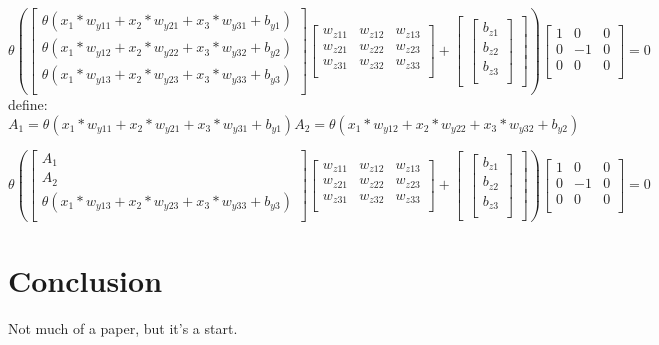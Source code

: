 \documentclass{article}
\begin{document}
\[
\theta(   
\begin{bmatrix}   
    \theta(x_1*w_{y11} + x_2*w_{y21} + x_3*w_{y31} + b_{y1})\\
    \theta(x_1*w_{y12} + x_2*w_{y22} + x_3*w_{y32} + b_{y2})\\
    \theta(x_1*w_{y13} + x_2*w_{y23} + x_3*w_{y33} + b_{y3})\\
    \end{bmatrix}
\begin{bmatrix}
    w_{z11} & w_{z12} & w_{z13}\\
    w_{z21} & w_{z22} & w_{z23}\\
    w_{z31} & w_{z32} & w_{z33}\\
\end{bmatrix}
    +
\begin{bmatrix}
    \begin{bmatrix}
        b_{z1}\\
        b_{z2}\\
        b_{z3}\\
    \end{bmatrix}
\end{bmatrix}
)
%
\begin{bmatrix}   
    1 & 0 & 0 \\
    0 & -1 & 0 \\
    0 & 0 & 0 \\
    \end{bmatrix} 
%
    = 0
\]
\hbox{define:}
\begin{equation}
    A_1 = \theta(x_1*w_{y11} + x_2*w_{y21} + x_3*w_{y31} + b_{y1})
    A_2 = \theta(x_1*w_{y12} + x_2*w_{y22} + x_3*w_{y32} + b_{y2}) 
\end{equation}

\[
\theta(   
\begin{bmatrix}   
    A_1\\
    A_2\\
    \theta(x_1*w_{y13} + x_2*w_{y23} + x_3*w_{y33} + b_{y3})\\
    \end{bmatrix}
\begin{bmatrix}
    w_{z11} & w_{z12} & w_{z13}\\
    w_{z21} & w_{z22} & w_{z23}\\
    w_{z31} & w_{z32} & w_{z33}\\
\end{bmatrix}
    +
\begin{bmatrix}
    \begin{bmatrix}
        b_{z1}\\
        b_{z2}\\
        b_{z3}\\
    \end{bmatrix}
\end{bmatrix}
)
%
\begin{bmatrix}   
    1 & 0 & 0 \\
    0 & -1 & 0 \\
    0 & 0 & 0 \\
    \end{bmatrix} 
%
    = 0
\]



\section{Conclusion}
Not much of a paper, but it's a start.
\end{document}

